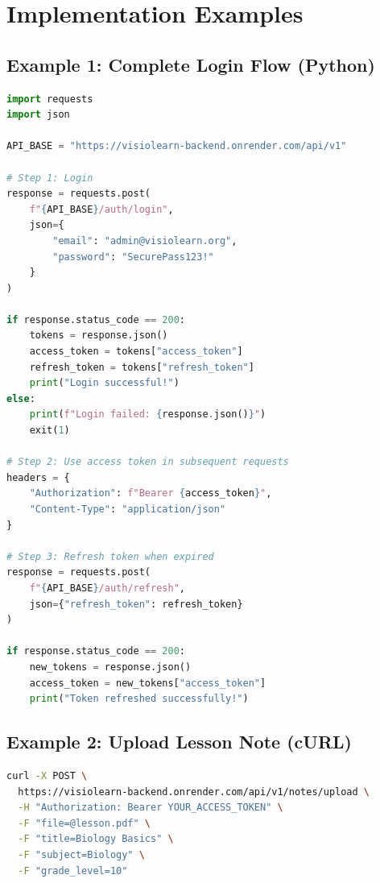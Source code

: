 \documentclass[12pt,a4paper,oneside]{article}
\begin{document}
\section{Implementation Examples}

\subsection{Example 1: Complete Login Flow (Python)}

\begin{lstlisting}[language=python]
import requests
import json

API_BASE = "https://visiolearn-backend.onrender.com/api/v1"

# Step 1: Login
response = requests.post(
    f"{API_BASE}/auth/login",
    json={
        "email": "admin@visiolearn.org",
        "password": "SecurePass123!"
    }
)

if response.status_code == 200:
    tokens = response.json()
    access_token = tokens["access_token"]
    refresh_token = tokens["refresh_token"]
    print("Login successful!")
else:
    print(f"Login failed: {response.json()}")
    exit(1)

# Step 2: Use access token in subsequent requests
headers = {
    "Authorization": f"Bearer {access_token}",
    "Content-Type": "application/json"
}

# Step 3: Refresh token when expired
response = requests.post(
    f"{API_BASE}/auth/refresh",
    json={"refresh_token": refresh_token}
)

if response.status_code == 200:
    new_tokens = response.json()
    access_token = new_tokens["access_token"]
    print("Token refreshed successfully!")
\end{lstlisting}

\subsection{Example 2: Upload Lesson Note (cURL)}

\begin{lstlisting}[language=bash]
curl -X POST \
  https://visiolearn-backend.onrender.com/api/v1/notes/upload \
  -H "Authorization: Bearer YOUR_ACCESS_TOKEN" \
  -F "file=@lesson.pdf" \
  -F "title=Biology Basics" \
  -F "subject=Biology" \
  -F "grade_level=10"
\end{lstlisting}
\end{document}
